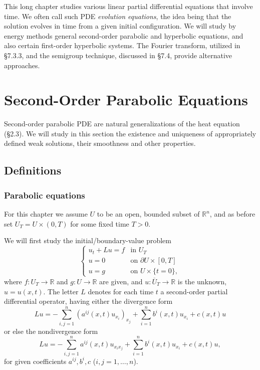 
This long chapter studies various linear partial differential equations that involve time. We often call such PDE \textit{evolution equations}, the idea being that the solution evolves in time from a given initial configuration. We will study by energy methods general second-order parabolic and hyperbolic equations, and also certain first-order hyperbolic systems. The Fourier transform, utilized in \S7.3.3, and the semigroup technique, discussed in \S7.4, provide alternative approaches.

\section{Second-Order Parabolic Equations}
\label{sec:second-order-parabolic-equations}

Second-order parabolic PDE are natural generalizations of the heat equation (\S2.3). We will study in this section the existence and uniqueness of appropriately defined weak solutions, their smoothness and other properties.

\subsection{Definitions}

\subsubsection{Parabolic equations}

For this chapter we assume $U$ to be an open, bounded subset of $\mathbb{R}^n$, and as before set $U_T = U \times (0, T)$ for some fixed time $T > 0$.

We will first study the initial/boundary-value problem
\[
\begin{cases}
u_t + Lu = f & \text{in } U_T \\
u = 0 & \text{on } \partial U \times [0, T] \\
u = g & \text{on } U \times \{t = 0\},
\end{cases}
\tag{1}
\]
where $f : U_T \to \mathbb{R}$ and $g : U \to \mathbb{R}$ are given, and $u : \overline{U}_T \to \mathbb{R}$ is the unknown, $u = u(x,t)$. The letter $L$ denotes for each time $t$ a second-order partial differential operator, having either the divergence form
\[
Lu = -\sum_{i,j=1}^{n} (a^{ij}(x,t)u_{x_i})_{x_j} + \sum_{i=1}^{n} b^i(x,t)u_{x_i} + c(x,t)u
\tag{2}
\]
or else the nondivergence form
\[
Lu = -\sum_{i,j=1}^{n} a^{ij}(x,t)u_{x_i x_j} + \sum_{i=1}^{n} b^i(x,t)u_{x_i} + c(x,t)u,
\tag{3}
\]
for given coefficients $a^{ij}, b^i, c$ ($i, j = 1, \ldots, n$).


